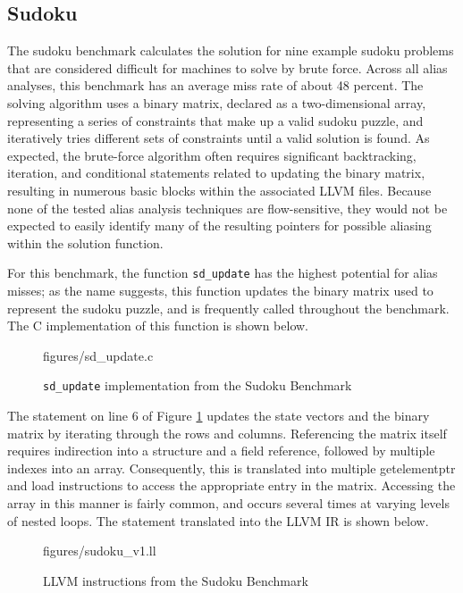 \subsection{Sudoku}
The sudoku benchmark calculates the solution for nine example sudoku problems that are considered difficult for machines to solve by brute force. Across all alias analyses, this benchmark has an average miss rate of about 48 percent. The solving algorithm uses a binary matrix, declared as a two-dimensional array, representing a series of constraints that make up a valid sudoku puzzle, and iteratively tries different sets of constraints until a valid solution is found. As expected, the brute-force algorithm often requires significant backtracking, iteration, and conditional statements related to updating the binary matrix, resulting in numerous basic blocks within the associated LLVM files. Because none of the tested alias analysis techniques are flow-sensitive, they would not be expected to easily identify many of the resulting pointers for possible aliasing within the solution function.

For this benchmark, the function \texttt{sd\_update} has the highest potential for alias misses; as the name suggests, this function updates the binary matrix used to represent the sudoku puzzle, and is frequently called throughout the benchmark. The C implementation of this function is shown below.

\begin{figure} [h]
   {figures/sd_update.c}
  \caption{\texttt{sd\_update} implementation from the Sudoku Benchmark}
  \label{fig:sdc}
\end{figure}

The statement on line 6 of Figure \ref{fig:sdc} updates the state vectors and the binary matrix by iterating through the rows and columns. Referencing the matrix itself requires indirection into a structure and a field reference, followed by multiple indexes into an array. Consequently, this is translated into multiple getelementptr and load instructions to access the appropriate entry in the matrix. Accessing the array in this manner is fairly common, and occurs several times at varying levels of nested loops. The statement translated into the LLVM IR is shown below.

\begin{figure} [h]
   {figures/sudoku_v1.ll}
  \caption{LLVM instructions from the Sudoku Benchmark}
  \label{fig:sdll}
\end{figure}

